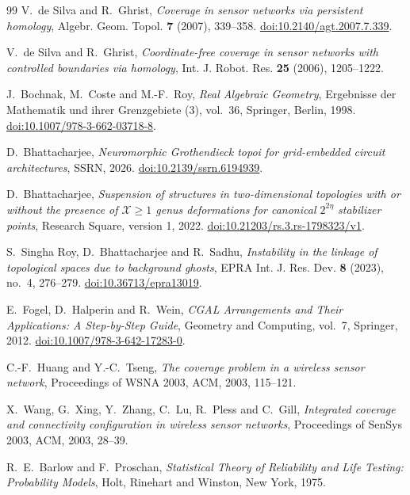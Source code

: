 \begin{thebibliography}{99}
V.~de Silva and R.~Ghrist,
\emph{Coverage in sensor networks via persistent homology},
Algebr. Geom. Topol. \textbf{7} (2007), 339--358.
\href{https://doi.org/10.2140/agt.2007.7.339}{doi:10.2140/agt.2007.7.339}.

V.~de Silva and R.~Ghrist,
\emph{Coordinate-free coverage in sensor networks with controlled boundaries via homology},
Int. J. Robot. Res. \textbf{25} (2006), 1205--1222.

J.~Bochnak, M.~Coste and M.-F.~Roy,
\emph{Real Algebraic Geometry},
Ergebnisse der Mathematik und ihrer Grenzgebiete (3), vol.~36, Springer, Berlin, 1998.
\href{https://doi.org/10.1007/978-3-662-03718-8}{doi:10.1007/978-3-662-03718-8}.

D.~Bhattacharjee,
\emph{Neuromorphic Grothendieck topoi for grid-embedded circuit architectures},
SSRN, 2026.
\href{https://doi.org/10.2139/ssrn.6194939}{doi:10.2139/ssrn.6194939}.

D.~Bhattacharjee,
\emph{Suspension of structures in two-dimensional topologies with or without the presence of $\mathcal X\ge1$ genus deformations for canonical $2^{2\eta}$ stabilizer points},
Research Square, version 1, 2022.
\href{https://doi.org/10.21203/rs.3.rs-1798323/v1}{doi:10.21203/rs.3.rs-1798323/v1}.

S.~Singha Roy, D.~Bhattacharjee and R.~Sadhu,
\emph{Instability in the linkage of topological spaces due to background ghosts},
EPRA Int. J. Res. Dev. \textbf{8} (2023), no.~4, 276--279.
\href{https://doi.org/10.36713/epra13019}{doi:10.36713/epra13019}.

E.~Fogel, D.~Halperin and R.~Wein,
\emph{CGAL Arrangements and Their Applications: A Step-by-Step Guide},
Geometry and Computing, vol.~7, Springer, 2012.
\href{https://doi.org/10.1007/978-3-642-17283-0}{doi:10.1007/978-3-642-17283-0}.

C.-F.~Huang and Y.-C.~Tseng,
\emph{The coverage problem in a wireless sensor network},
Proceedings of WSNA 2003, ACM, 2003, 115--121.

X.~Wang, G.~Xing, Y.~Zhang, C.~Lu, R.~Pless and C.~Gill,
\emph{Integrated coverage and connectivity configuration in wireless sensor networks},
Proceedings of SenSys 2003, ACM, 2003, 28--39.

R.~E.~Barlow and F.~Proschan,
\emph{Statistical Theory of Reliability and Life Testing: Probability Models},
Holt, Rinehart and Winston, New York, 1975.


\end{thebibliography}
